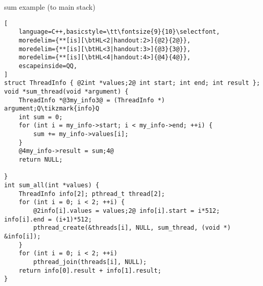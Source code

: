\begin{frame}[fragile,label=sumNoGlobals]{sum example (to main stack)}
\begin{lstlisting}[
    language=C++,basicstyle=\tt\fontsize{9}{10}\selectfont,
    moredelim={**[is][\btHL<2|handout:2>]{@2}{2@}},
    moredelim={**[is][\btHL<3|handout:3>]{@3}{3@}},
    moredelim={**[is][\btHL<4|handout:4>]{@4}{4@}},
    escapeinside=QQ,
]
struct ThreadInfo { @2int *values;2@ int start; int end; int result };
void *sum_thread(void *argument) {
    ThreadInfo *@3my_info3@ = (ThreadInfo *) argument;Q\tikzmark{info}Q
    int sum = 0;
    for (int i = my_info->start; i < my_info->end; ++i) {
        sum += my_info->values[i];
    }
    @4my_info->result = sum;4@
    return NULL;

}
int sum_all(int *values) {
    ThreadInfo info[2]; pthread_t thread[2];
    for (int i = 0; i < 2; ++i) {
        @2info[i].values = values;2@ info[i].start = i*512; info[i].end = (i+1)*512;
        pthread_create(&threads[i], NULL, sum_thread, (void *) &info[i]);
    }
    for (int i = 0; i < 2; ++i)
        pthread_join(threads[i], NULL);
    return info[0].result + info[1].result;
}
\end{lstlisting}
\end{frame}
